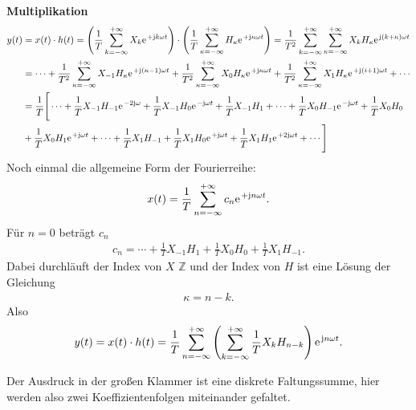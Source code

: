 \documentclass[11pt,a4paper,DIV=12]{scrartcl}
\begin{document}
\textbf{Multiplikation}
%
\begin{align}
	y(t)&=x(t)\cdot h(t)
	=\left (\frac{1}{T}\sum_{k=-\infty}^{+\infty}X_k\e^{+\im k \omega t}\right )\cdot\left ( \frac{1}{T}\sum_{\kappa=-\infty}^{+\infty}H_{\kappa}\e^{+\im \kappa \omega t}\right )
	=\frac{1}{T^2}\sum_{k=-\infty}^{+\infty}\sum_{\kappa=-\infty}^{+\infty}X_kH_{\kappa}\e^{\im (k+\kappa)\omega t}\nonumber \\
	&=\cdots +\frac{1}{T^2}\sum_{\kappa=-\infty}^{+\infty}X_{-1}H_{\kappa}\e^{+\im(\kappa-1)\omega t}+\frac{1}{T^2}\sum_{\kappa=-\infty}^{+\infty}X_0H_{\kappa}\e^{+\im \kappa \omega t}+\frac{1}{T^2}\sum_{\kappa=-\infty}^{+\infty}X_1H_{\kappa}\e^{+\im(i+1)\omega t}+\cdots\nonumber \\
	&=\frac{1}{T}\Bigg [\cdots+\frac{1}{T}X_{-1}H_{-1}\e^{-2\im \omega }+\frac{1}{T}X_{-1}H_0\e^{-\im \omega t}+\frac{1}{T}X_{-1}H_1+\cdots+\frac{1}{T}X_0H_{-1}\e^{-\im \omega t}+\frac{1}{T}X_0H_0\nonumber\\
	&+\frac{1}{T}X_0H_1\e^{+\im  \omega t}
	+\cdots+\frac{1}{T}X_1H_{-1}+\frac{1}{T}X_1H_0\e^{+\im \omega t}
	+\frac{1}{T}X_1H_1\e^{+2\im \omega t}+\cdots\Bigg]
\end{align}
%
%
Noch einmal die allgemeine Form der Fourierreihe:
%
\begin{align}
	x(t)=\frac{1}{T}\sum_{n=-\infty}^{+\infty}c_n\e^{+\im n \omega t}.
\end{align}
%
Für $n=0$ beträgt $c_n$
%
\begin{align}
	c_n=\cdots + \frac{1}{T}X_{-1}H_{1}+\frac{1}{T}X_0H_0+\frac{1}{T}X_1H_{-1}.
\end{align}
%
Dabei durchläuft der Index von $X$ $\mathbb{Z}$ und der Index von $H$ ist eine
Lösung der Gleichung
%
\begin{align}
	\kappa = n-k.
\end{align}
%
Also
%
\begin{align}
	y(t)=x(t)\cdot h(t)=\frac{1}{T}\sum_{n=-\infty}^{+\infty}\left(\sum_{k=-\infty}^{+\infty}\frac{1}{T}X_kH_{n-k}\right)\e^{\im n \omega t}.
\end{align}

Der Ausdruck in der großen Klammer ist eine diskrete Faltungssumme, hier werden
also zwei Koeffizientenfolgen miteinander gefaltet.
\end{document}
